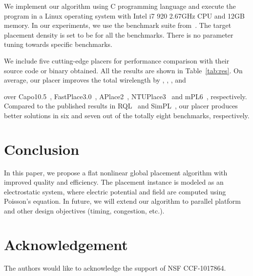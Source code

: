 \documentclass[conference,10pt]{IEEEtran}
\begin{document}
We implement our algorithm 
using C programming language and 
execute the program in a
Linux operating system with Intel i7 920 2.67GHz CPU
and 12GB memory. 
In our experiments, 
we use the benchmark suite from~\cite{ispd05}.
The target placement density  is set 
to be  for all the benchmarks.
There is no parameter tuning towards specific benchmarks.

We include 
five cutting-edge placers for performance comparison 
with their source code or binary obtained. 
All the results are shown in Table~\ref{tab:res}.
On average, our placer improves the total wirelength by
,
,
,
 and 
 
over
Capo10.5~\cite{capo}, 
FastPlace3.0~\cite{fp3},
APlace2~\cite{aplace2},
NTUPlace3~\cite{ntupl3} and 
mPL6~\cite{mpl6}, 
respectively.
Compared to the published results in 
RQL~\cite{rql} and SimPL~\cite{simpl}, 
our placer produces better solutions  
in six and seven out of the totally eight
benchmarks, respectively.
















\section{Conclusion}
\label{sec:conc}
\vspace{-0.05in}

In this paper, 
we propose a flat nonlinear global placement algorithm 
with improved quality and efficiency. 
The placement instance is modeled as an electrostatic system, 
where electric potential and field are computed using Poisson's equation. 
In future, we will extend our algorithm to parallel platform 
and other design objectives (timing, congestion, etc.).



\section{Acknowledgement}
\label{sec:ack}
The authors would like to acknowledge the support of NSF CCF-1017864.




\end{document}

